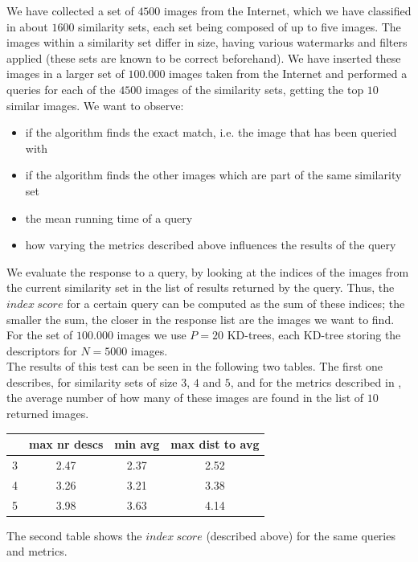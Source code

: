 \documentclass[conference]{IEEEtran}
\begin{document}
We have collected a set of $4500$ images from the Internet, which we have classified in about $1600$ similarity sets, each set being composed of up to five images. The images within a similarity set differ in size, having various watermarks and filters applied (these sets are known to be correct beforehand). We have inserted these images in a larger set of $100.000$ images taken from the Internet and performed a queries for each of the $4500$ images of the similarity sets, getting the top $10$ similar images. We want to observe:
\begin{itemize}
	\item if the algorithm finds the exact match, i.e. the image that has been queried with
	\item if the algorithm finds the other images which are part of the same similarity set
	\item the mean running time of a query
	\item how varying the metrics described above influences the results of the query
\end{itemize}

We evaluate the response to a query, by looking at the indices of the images from the current similarity set in the list of results returned by the query. Thus, the $index\ score$ for a certain query can be computed as the sum of these indices; the smaller the sum, the closer in the response list are the images we want to find. \\
For the set of $100.000$ images we use $P=20$ KD-trees, each KD-tree storing the descriptors for $N=5000$ images.\\
The results of this test can be seen in the following two tables. The first one describes, for similarity sets of size $3$, $4$ and $5$, and for the metrics described in , the average number of how many of these images are found in the list of $10$ returned images.\\

\begin{tabular} {c | c | c | c}
	& max nr descs & min avg & max dist to avg \\
	\hline
	3 & 2.47 & 2.37 & 2.52 \\
	\hline
	4 & 3.26 & 3.21 & 3.38 \\
	\hline
	5 & 3.98 & 3.63 & 4.14 \\
\end{tabular}

The second table shows the $index\ score$ (described above) for the same queries and metrics.\\
\end{document}
